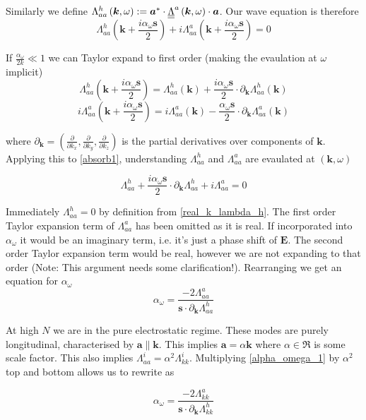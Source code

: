 Similarly we define $\Lambda_{aa}^h \left( \bm{k}, \omega \right) := \bm{a}^{*} \cdot \underline{\underline{\Lambda}}^a \left( \bm{k}, \omega \right) \cdot \bm{a}$. Our wave equation is therefore
\begin{equation} \label{absorb1}
	\Lambda_{aa}^h \left( \bm{k} + \frac{i \alpha_{\omega} \bm{s}}{2} \right) + i \Lambda_{aa}^a \left( \bm{k} + \frac{i \alpha_{\omega} \bm{s}}{2} \right) = 0
\end{equation}

If $\frac{\alpha_{\omega}}{2k} \ll 1$ we can Taylor expand to first order (making the evaulation at $\omega$ implicit)
\begin{equation}
	\Lambda_{aa}^h \left( \bm{k} + \frac{i \alpha_{\omega} \bm{s}}{2} \right) = \Lambda_{aa}^h \left( \bm{k} \right) + \frac{i \alpha_{\omega} \bm{s}}{2} \cdot \partial_{\bm{k}} \Lambda_{aa}^h \left( \bm{k} \right)
\end{equation}
\begin{equation}
	i\Lambda_{aa}^a \left( \bm{k} + \frac{i \alpha_{\omega} \bm{s}}{2} \right) = i\Lambda_{aa}^a \left( \bm{k} \right) - \frac{\alpha_{\omega} \bm{s}}{2} \cdot \partial_{\bm{k}} \Lambda_{aa}^a \left( \bm{k} \right)
\end{equation}

where $\partial_{\bm{k}} = \left( \frac{\partial}{\partial k_x}, \frac{\partial}{\partial k_y}, \frac{\partial}{\partial k_z} \right)$ is the partial derivatives over components of $\bm{k}$. Applying this to \eqref{absorb1}, understanding $\Lambda_{aa}^h$ and $\Lambda_{aa}^a$ are evaulated at $\left(\bm{k}, \omega \right)$

\begin{equation}
	\Lambda_{aa}^h + \frac{i \alpha_{\omega} \bm{s}}{2} \cdot \partial_{\bm{k}} \Lambda_{aa}^h + i \Lambda_{aa}^a = 0
\end{equation}

Immediately $\Lambda_{aa}^h = 0$ by definition from \eqref{real_k_lambda_h}. The first order Taylor expansion term of $\Lambda_{aa}^a$ has been omitted as it is real. If incorporated into $\alpha_{\omega}$ it would be an imaginary term, i.e. it's just a phase shift of $\bm{E}$. The second order Taylor expansion term would be real, however we are not expanding to that order (Note: This argument needs some clarification!). Rearranging we get an equation for $\alpha_{\omega}$
\begin{equation}\label{alpha_omega_1}
	\alpha_{\omega} = \frac{-2 \Lambda_{aa}^a}{\bm{s} \cdot \partial_{\bm{k}} \Lambda_{aa}^h}
\end{equation}

At high $N$ we are in the pure electrostatic regime. These modes are purely longitudinal, characterised by $\bm{a} \parallel \bm{k}$. This implies $\bm{a} = \alpha \bm{k}$ where $\alpha \in \Re$ is some scale factor. This also implies $\Lambda_{aa}^i=\alpha^2 \Lambda_{kk}^i$. Multiplying \eqref{alpha_omega_1} by $\alpha^2$ top and bottom allows us to rewrite as

\begin{equation}\label{alpha_omega_es_1}
	\alpha_{\omega} = \frac{-2 \Lambda_{kk}^a}{\bm{s} \cdot \partial_{\bm{k}} \Lambda_{kk}^h}
\end{equation}


